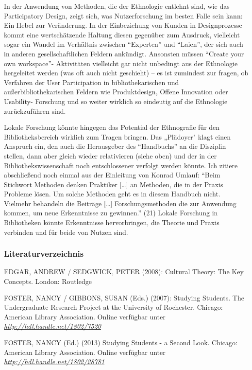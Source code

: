 \documentclass[a4paper,
fontsize=11pt,
oneside,
numbers=noperiodatend,
parskip=half-,
bibliography=totoc,
final
]{scrartcl}
\begin{document}
In der Anwendung von Methoden, die der Ethnologie entlehnt sind, wie das
Participatory Design, zeigt sich, was Nutzerforschung im besten Falle
sein kann: Ein Hebel zur Veränderung. In der Einbeziehung von Kunden in
Designprozesse kommt eine wertschätzende Haltung diesen gegenüber zum
Ausdruck, vielleicht sogar ein Wandel im Verhältnis zwischen
\enquote{Experten} und \enquote{Laien}, der sich auch in anderen
gesellschaftlichen Feldern ankündigt. Ansonsten müssen \enquote{Create
your own workspace}- Aktivitäten vielleicht gar nicht unbedingt aus der
Ethnologie hergeleitet werden (was oft auch nicht geschieht) -- es ist
zumindest zur fragen, ob Verfahren der User Participation in
bibliothekarischen und außerbibliothekarischen Feldern wie
Produktdesign, Offene Innovation oder Usability- Forschung und so weiter
wirklich so eindeutig auf die Ethnologie zurückzuführen sind.

Lokale Forschung könnte hingegen das Potential der Ethnografie für den
Bibliotheksbereich wirklich zum Tragen bringen. Das „Plädoyer" klagt
einen Anspruch ein, den auch die Herausgeber des \enquote{Handbuchs} an
die Disziplin stellen, dann aber gleich wieder relativieren (siehe oben)
und der in der Bibliothekswissenschaft noch entschlossener verfolgt
werden könnte. Ich zitiere abschließend noch einmal aus der Einleitung
von Konrad Umlauf: \enquote{Beim Stichwort Methoden denken Praktiker
{[}\ldots{}{]} an Methoden, die in der Praxis Probleme lösen. Um solche
Methoden geht es in diesem Handbuch nicht. Vielmehr behandeln die
Beiträge {[}\ldots{}{]} Forschungsmethoden die zur Anwendung kommen, um
neue Erkenntnisse zu gewinnen.} (21) Lokale Forschung in Bibliotheken
könnte Erkenntnisse hervorbringen, die Theorie und Praxis verbinden und
für beide von Nutzen sind.

\subsubsection{Literaturverzeichnis}\label{literaturverzeichnis}

EDGAR, ANDREW / SEDGWICK, PETER (2008): Cultural Theory: The Key
Concepts. London: Routledge

FOSTER, NANCY / GIBBONS, SUSAN (Eds.) (2007): Studying Students. The
Undergraduate Research Project at the University of Rochester. Chicago:
American Library Association. Online verfügbar unter
\href{http://hdl.handle.net/1802/7520}{\emph{http://hdl.handle.net/1802/7520}}

FOSTER, NANCY (Ed.) (2013) Studying Students - a Second Look. Chicago:
American Library Association. Online verfügbar unter
\href{http://hdl.handle.net/1802/28781}{\emph{http://hdl.handle.net/1802/28781}}
\end{document}
